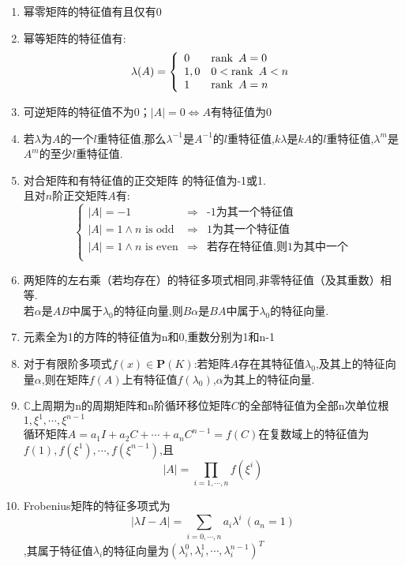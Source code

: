 \documentclass[UTF8,a4paper,notitlepage]{book}
\begin{document}
        \begin{corollary}[特征值的结论]\begin{enumerate}\mbox{}%
            \item 幂零矩阵的特征值有且仅有0
            \item 幂等矩阵的特征值有:$$\lambda(A)=\left\{\begin{array}{ll}
                0&\operatorname{rank}~A=0\\ 1,0&0<\operatorname{rank}~A<n\\ 1&\operatorname{rank}~A=n\\ 
            \end{array}\right.$$
            \item 可逆矩阵的特征值不为0；$|A|=0\Leftrightarrow A$有特征值为0
            \item 若$\lambda$为$A$的一个$l$重特征值,那么$\lambda^{-1}$是$A^{-1}$的$l$重特征值,$k\lambda$是$kA$的$l$重特征值,$\lambda^m$是$A^m$的至少$l$重特征值.%
            \item 对合矩阵和有特征值的正交矩阵 的特征值为-1或1.\\且对$n$阶正交矩阵$A$有:$$\left\{\begin{array}{lll}
                |A|=-1&\Rightarrow&\text{-1为其一个特征值}\\
                |A|=1\land n\text{~is~odd}&\Rightarrow&\text{1为其一个特征值}\\
                |A|=1\land n\text{~is~even}&\Rightarrow&\text{若存在特征值,则1为其中一个}\\
            \end{array}\right.$$
            \item 两矩阵的左右乘（若均存在）的特征多项式相同,非零特征值（及其重数）相等.\\ 若$\alpha$是$AB$中属于$\lambda_0$的特征向量,则$B\alpha$是$BA$中属于$\lambda_0$的特征向量.
            \item 元素全为1的方阵的特征值为n和0,重数分别为1和n-1
            \item 对于有限阶多项式$f(x)\in \mathbf{P}(K)$:若矩阵$A$存在其特征值$\lambda_0$,及其上的特征向量$\alpha$,则在矩阵$f(A)$上有特征值$f(\lambda_0)$,$\alpha$为其上的特征向量.
            \item $\mathbb{C}$上周期为n的周期矩阵和n阶循环移位矩阵$C$的全部特征值为全部n次单位根$1,\xi^1,\cdots,\xi^{n-1}$\\ 循环矩阵$A=a_1I+a_2C+\cdots+a_nC^{n-1}=f(C)$在复数域上的特征值为$f(1),f(\xi^1),\cdots,f(\xi^{n-1})$,且$$|A|=\prod_{i=1,\cdots,n}f(\xi^i)$$
            \item Frobenius矩阵的特征多项式为$$|\lambda I-A|=\sum_{i=0,\cdots,n}a_i\lambda^i~(a_n=1)$$,其属于特征值$\lambda_i$的特征向量为$(\lambda_i^0,\lambda_i^1,\cdots,\lambda_i^{n-1})^T$
        \end{enumerate}\end{corollary}
\end{document}
